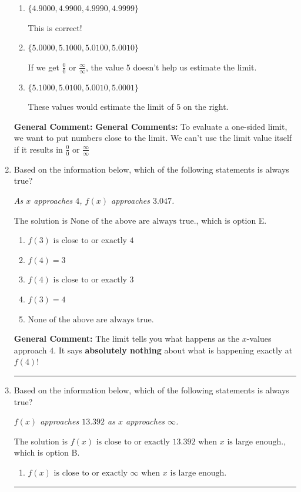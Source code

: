 \documentclass{extbook}[14pt]
\newcommand{\litem}[1]{\item #1

\rule{\textwidth}{0.4pt}}
\begin{document}
\begin{enumerate}
{\begin{enumerate}[label=\Alph*.]
If we get $\frac{0}{0}$ or $\frac{\infty}{\infty}$, the value 5 doesn't help us estimate the limit.
\item \( \{ 4.9000, 4.9900, 4.9990, 4.9999 \} \)

This is correct!
\item \( \{ 5.0000, 5.1000, 5.0100, 5.0010 \} \)

If we get $\frac{0}{0}$ or $\frac{\infty}{\infty}$, the value 5 doesn't help us estimate the limit.
\item \( \{ 5.1000, 5.0100, 5.0010, 5.0001 \} \)

These values would estimate the limit of 5 on the right.
\end{enumerate}

\textbf{General Comment:} \textbf{General Comments:} To evaluate a one-sided limit, we want to put numbers close to the limit. We can't use the limit value itself if it results in $\frac{0}{0}$ or $\frac{\infty}{\infty}$
}
\litem{
Based on the information below, which of the following statements is always true?

\begin{center}
    \textit{ As $x$ approaches $4$, $f(x)$ approaches $3.047$. }
\end{center}
The solution is \( \text{None of the above are always true.} \), which is option E.\begin{enumerate}[label=\Alph*.]
\item \( f(3) \text{ is close to or exactly } 4 \)


\item \( f(4) = 3 \)


\item \( f(4) \text{ is close to or exactly } 3 \)


\item \( f(3) = 4 \)


\item \( \text{None of the above are always true.} \)


\end{enumerate}

\textbf{General Comment:} The limit tells you what happens as the $x$-values approach $4$. It says \textbf{absolutely nothing} about what is happening exactly at $f(4)$!
}
\litem{
Based on the information below, which of the following statements is always true?

\begin{center}
    \textit{ $f(x)$ approaches $13.392$ as $x$ approaches $\infty$. }
\end{center}
The solution is \( f(x) \text{ is close to or exactly } 13.392 \text{ when } x \text{ is large enough}. \), which is option B.\begin{enumerate}[label=\Alph*.]
\item \( f(x) \text{ is close to or exactly } \infty \text{ when } x \text{ is large enough}. \)



\end{enumerate}}
\end{enumerate}
\end{document}
